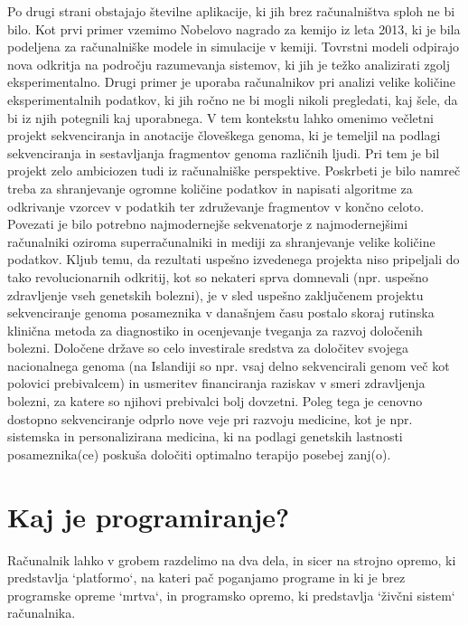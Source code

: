 Po drugi strani obstajajo številne aplikacije, ki jih brez računalništva sploh ne bi bilo. Kot prvi primer vzemimo Nobelovo nagrado za kemijo iz leta 2013, ki je bila podeljena za računalniške modele in simulacije v kemiji. Tovrstni modeli odpirajo nova odkritja na področju razumevanja sistemov, ki jih je težko analizirati zgolj eksperimentalno. Drugi primer je uporaba računalnikov pri analizi velike količine eksperimentalnih podatkov, ki jih ročno ne bi mogli nikoli pregledati, kaj šele, da bi iz njih potegnili kaj uporabnega. V tem kontekstu lahko omenimo večletni projekt sekvenciranja in anotacije človeškega genoma, ki je temeljil na podlagi sekvenciranja in sestavljanja fragmentov genoma različnih ljudi. Pri tem je bil projekt zelo ambiciozen tudi iz računalniške perspektive. Poskrbeti je bilo namreč treba za shranjevanje ogromne količine podatkov in napisati algoritme za odkrivanje vzorcev v podatkih ter združevanje fragmentov v končno celoto. Povezati je bilo potrebno najmodernejše sekvenatorje z najmodernejšimi računalniki oziroma superračunalniki in mediji za shranjevanje velike količine podatkov. Kljub temu, da rezultati uspešno izvedenega projekta niso pripeljali do tako revolucionarnih odkritij, kot so nekateri sprva domnevali (npr. uspešno zdravljenje vseh genetskih bolezni), je v sled uspešno zaključenem projektu sekvenciranje genoma posameznika v današnjem času postalo skoraj rutinska klinična metoda za diagnostiko in ocenjevanje tveganja za razvoj določenih bolezni. Določene države so celo investirale sredstva za določitev svojega nacionalnega genoma (na Islandiji so npr. vsaj delno sekvencirali genom več kot polovici prebivalcem) in usmeritev financiranja raziskav v smeri zdravljenja bolezni, za katere so njihovi prebivalci bolj dovzetni. Poleg tega je cenovno dostopno sekvenciranje odprlo nove veje pri razvoju medicine, kot je npr. sistemska in personalizirana medicina, ki na podlagi genetskih lastnosti posameznika(ce) poskuša določiti optimalno terapijo posebej zanj(o).

\section{Kaj je programiranje?}

Računalnik lahko v grobem razdelimo na dva dela, in sicer na strojno opremo, ki predstavlja `platformo`, na kateri pač poganjamo programe in ki je brez programske opreme `mrtva`, in programsko opremo, ki predstavlja `živčni sistem` računalnika. %

